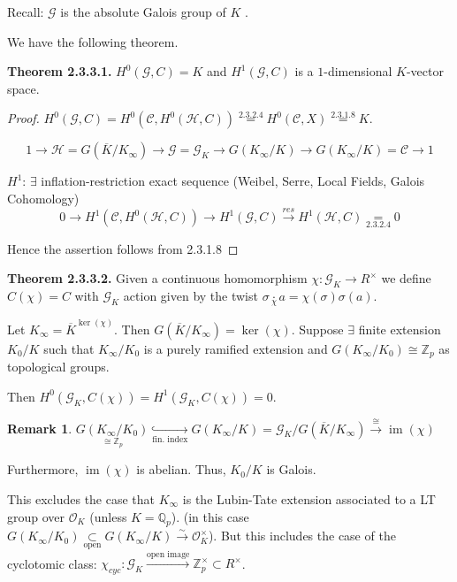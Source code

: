 \documentclass{article}
\theoremstyle{definition}
\numberwithin{theorem}{subsection}
\newtheorem*{remark}{Remark}
\begin{document}
    Recall: \(\mathscr{G}\) is the absolute Galois group of \(K\) .

    We have the following theorem.

    \textbf{Theorem 2.3.3.1.} \(H^0(\mathscr{G}, C) = K\) and \(H^1(\mathscr{G},C)\) is a \(1\)-dimensional \(K\)-vector space. 

    \begin{proof}
        \(H^0(\mathscr{G}, C) = H^0(\mathscr{C}, H^0(\mathscr{H}, C)) \overset{2.3.2.4}{=} H^0(\mathscr{C},X) \overset{2.3.1.8}{=} K\).
        
        \[
            1 \to \mathscr{H} = G(\overline{K} / K_\infty) \to \mathscr{G} = \mathscr{G}_K \to G(K_\infty / K) \to G(K_\infty / K) = \mathscr{C} \to 1
        \]

        \underline{\(H^1\)}: \(\exists\) inflation-restriction exact sequence (Weibel, Serre, Local Fields, Galois Cohomology)
        \[
            0 \to H^1(\mathscr{C}, H^0(\mathscr{H}, C)) \to H^1(\mathscr{G}, C) \xrightarrow{res} H^1(\mathscr{H}, C) \underset{2.3.2.4}{=} 0
        \]

        Hence the assertion follows from 2.3.1.8
        
    \end{proof}

    \textbf{Theorem 2.3.3.2.} Given a continuous homomorphism \(\chi: \mathscr{G}_K \to R^\times\) we define \(C(\chi) = C\) with \(\mathscr{G}_K\) action given by the twist \(\sigma \underset{\chi}{\cdot} a = \chi(\sigma) \sigma(a)\).

    Let \(K_\infty = \overline{K}^{\ker (\chi)}\). Then \(G(\overline{K} / K_\infty) = \ker (\chi)\). Suppose \(\exists\) finite extension \(K_0 / K\) such that \(K_\infty / K_0\) is a purely ramified extension and \(G(K_\infty / K_0) \cong \mathbb{Z}_p\) as topological groups.
    
    Then \(H^0(\mathscr{G}_K, C(\chi)) = H^1(\mathscr{G}_K, C(\chi)) = 0\).

    \begin{remark}
        \(\underset{\cong \mathbb{Z}_p}{G(K_\infty / K_0)} \underset{\text{fin. index}}{\hookrightarrow}  G(K_\infty / K) = \mathscr{G}_K / G(\overline{K} / K_\infty) \xrightarrow{\cong} \operatorname{im}(\chi)\)
    
        Furthermore, \(\operatorname{im}(\chi)\) is abelian. Thus, \(K_0 / K\) is Galois.
    
        This excludes the case that \(K_\infty\) is the Lubin-Tate extension associated to a LT group over \(\mathcal{O}_K\) (unless \(K=\mathbb{Q}_p\)). (in this case \(G(K_\infty / K_0) \underset{\text{open}}{\subset} G(K_\infty / K) \xrightarrow{\sim} \mathcal{O}_K^\times\)). But this includes the case of the cyclotomic class: \(\chi_{cyc}: \mathscr{G}_K \xrightarrow{\text{open image}} \mathbb{Z}_p^\times \subset R^\times\).
    
    \end{remark}
\end{document}
